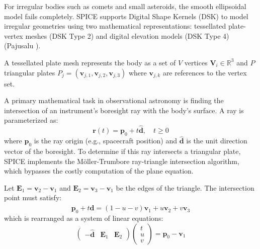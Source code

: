 \documentclass{acta}
\begin{document}
For irregular bodies such as comets and small asteroids, the smooth ellipsoidal model fails completely. SPICE supports Digital Shape Kernels (DSK) to model irregular geometries using two mathematical representations: tessellated plate-vertex meshes (DSK Type 2) and digital elevation models (DSK Type 4) (Pajusalu ). 

A tessellated plate mesh represents the body as a set of $V$ vertices $\mathbf{V}_i \in \mathbb{R}^3$ and $P$ triangular plates $P_j = (\mathbf{v}_{j,1}, \mathbf{v}_{j,2}, \mathbf{v}_{j,3})$ where $\mathbf{v}_{j,k}$ are references to the vertex set. 

A primary mathematical task in observational astronomy is finding the intersection of an instrument's boresight ray with the body's surface. A ray is parameterized as:
\begin{equation}
\mathbf{r}(t) = \mathbf{p}_0 + t \mathbf{\hat{d}}, \quad t \ge 0
\end{equation}
where $\mathbf{p}_0$ is the ray origin (e.g., spacecraft position) and $\mathbf{\hat{d}}$ is the unit direction vector of the boresight. To determine if this ray intersects a triangular plate, SPICE implements the Möller-Trumbore ray-triangle intersection algorithm, which bypasses the costly computation of the plane equation. 

Let $\mathbf{E}_1 = \mathbf{v}_2 - \mathbf{v}_1$ and $\mathbf{E}_2 = \mathbf{v}_3 - \mathbf{v}_1$ be the edges of the triangle. The intersection point must satisfy:
\begin{equation}
\mathbf{p}_0 + t \mathbf{\hat{d}} = (1 - u - v)\mathbf{v}_1 + u\mathbf{v}_2 + v\mathbf{v}_3
\end{equation}
which is rearranged as a system of linear equations:
\begin{equation}
\begin{pmatrix} -\mathbf{\hat{d}} & \mathbf{E}_1 & \mathbf{E}_2 \end{pmatrix} \begin{pmatrix} t \\ u \\ v \end{pmatrix} = \mathbf{p}_0 - \mathbf{v}_1
\end{equation}
\end{document}
